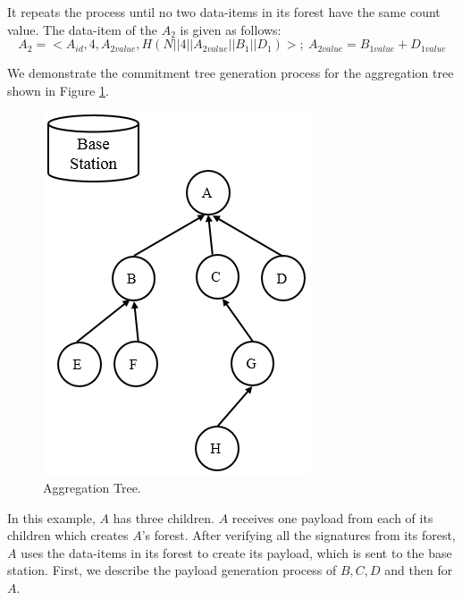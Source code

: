 	It repeats the process until no two data-items in its forest have the same count value.	
	The data-item of the $A_{2}$ is given as follows:
	\begin{equation}
		A_{2} = <A_{id}, 4, A_{2value},H(N||4||A_{2value}||B_{1}||D_{1})>;\ A_{2value} = B_{1value} + D_{1value} 
	\end{equation}
	
	We demonstrate the commitment tree generation process for the aggregation tree shown in Figure \ref{fig:Aggregation-tree-1}.
		\begin{figure}[h!]
			\centering
			\includegraphics{images/aggregation-tree-1.png}
			\caption{Aggregation Tree.}
			\label{fig:Aggregation-tree-1}
		\end{figure}
		In this example, $A$ has three children. $A$ receives one payload from each of its children which creates $A$'s forest.
		After verifying all the signatures from its forest, $A$ uses the data-items in its forest to create its payload, which is sent to the base station.
		First, we describe the payload generation process of $B,C,D$ and then for $A$.

